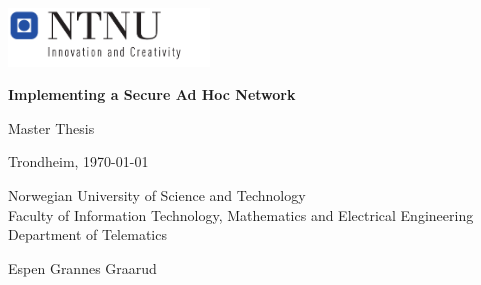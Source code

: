 \begin{titlepage}
 
	\parindent=0cm
	\addtolength{\parskip}{\baselineskip}

	\includegraphics[width=0.4\textwidth]{images/logo_ntnu.pdf}
	\vspace{2cm}\vspace{0.5cm}
	
	{\Huge \textbf{Implementing a Secure Ad Hoc Network}}

	{\LARGE Master Thesis}
	
	\vspace{1.5cm}	

	\vfill
	
	{\normalsize Trondheim, \today
	
	Norwegian University of Science and Technology\\
	Faculty of Information Technology, Mathematics and Electrical Engineering \\
	Department of Telematics}
	\vspace{2cm}\vspace{0.75cm}

	{\large Espen Grannes Graarud}
	

\end{titlepage}
